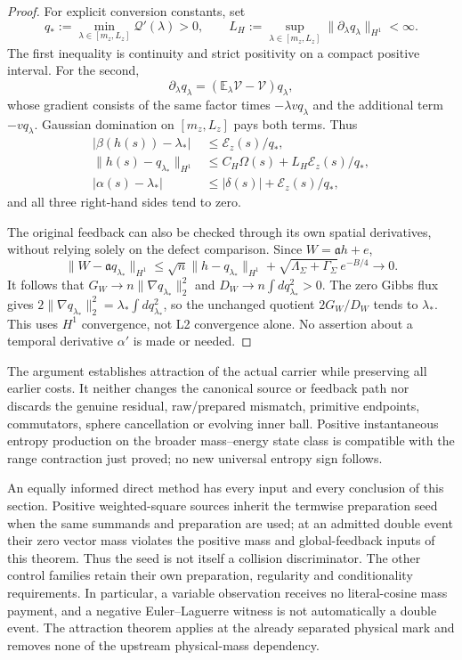 \documentclass[11pt]{article}
\numberwithin{equation}{section}
\begin{document}
\begin{proof}
For explicit conversion constants, set
\[
 q_*:=\min_{\lambda\in[m_z,L_z]}\mathcal Q'(\lambda)>0,
 \qquad
 L_H:=\sup_{\lambda\in[m_z,L_z]}
                     \|\partial_\lambda q_\lambda\|_{H^1}<\infty.
\]
The first inequality is continuity and strict positivity on a compact
positive interval. For the second,
\[
 \partial_\lambda q_\lambda
  =(\mathbb E_\lambda\mathcal V-\mathcal V)q_\lambda,
\]
whose gradient consists of the same factor times
$-\lambda vq_\lambda$ and the additional term $-vq_\lambda$.
Gaussian domination on $[m_z,L_z]$ pays both terms. Thus
\begin{align}
 |\beta(h(s))-\lambda_*|&\le\mathcal E_z(s)/q_*,
 \label{r15:betaconvergence}\\
 \|h(s)-q_{\lambda_*}\|_{H^1}
 &\le C_H\Omega(s)+L_H\mathcal E_z(s)/q_*,
 \label{r15:carrierconvergence}\\
 |\alpha(s)-\lambda_*|
 &\le|\delta(s)|+\mathcal E_z(s)/q_*,
 \label{r15:alphaconvergence}
\end{align}
and all three right-hand sides tend to zero.

The original feedback can also be checked through its own spatial
derivatives, without relying solely on the defect comparison. Since
$W=\mathfrak a h+e$,
\[
 \|W-\mathfrak a q_{\lambda_*}\|_{H^1}
 \le\sqrt n\|h-q_{\lambda_*}\|_{H^1}
       +\sqrt{\Lambda_\Sigma+\Gamma_\Sigma}\,e^{-B/4}\longrightarrow0.
\]
It follows that
$G_W\to n\|\nabla q_{\lambda_*}\|_2^2$ and
$D_W\to n\int d q_{\lambda_*}^2>0$.
The zero Gibbs flux gives
$2\|\nabla q_{\lambda_*}\|_2^2=\lambda_*\int d q_{\lambda_*}^2$,
so the unchanged quotient $2G_W/D_W$ tends to $\lambda_*$.
This uses $H^1$ convergence, not L2 convergence alone. No assertion
about a temporal derivative $\alpha'$ is made or needed.
\end{proof}

The argument establishes attraction of the actual carrier while preserving
all earlier costs. It neither changes the canonical source or feedback
path nor discards the genuine residual, raw/prepared mismatch, primitive
endpoints, commutators, sphere cancellation or evolving inner ball.
Positive instantaneous entropy production on the broader mass--energy
state class is compatible with the range contraction just proved; no new
universal entropy sign follows.

An equally informed direct method has every input and every conclusion
of this section. Positive weighted-square sources inherit the termwise
preparation seed when the same summands and preparation are used; at
an admitted double event their zero vector mass violates the positive
mass and global-feedback inputs of this theorem. Thus the seed is not
itself a collision discriminator. The other control families retain
their own preparation, regularity and conditionality requirements.
In particular, a variable observation receives no literal-cosine mass
payment, and a negative Euler--Laguerre witness is not automatically a
double event. The attraction theorem applies at the already separated
physical mark and removes none of the upstream physical-mass dependency.
\end{document}

